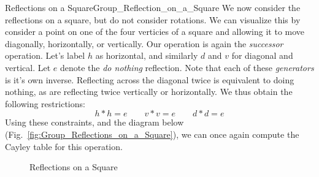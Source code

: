     \begin{lexample}{Reflections on a Square}{Group_Reflection_on_a_Square}
        We now consider the reflections on a square, but do not consider
        rotations. We can visualize this by consider a point on one of the
        four verticies of a square and allowing it to move diagonally,
        horizontally, or vertically. Our operation is again the
        \textit{successor} operation. Let's label $h$ as horizontal, and
        similarly $d$ and $v$ for diagonal and vertical. Let $e$ denote the
        \textit{do nothing} reflection. Note that each of these
        \textit{generators} is it's own inverse. Reflecting across the
        diagonal twice is equivalent to doing nothing, as are reflecting twice
        vertically or horizontally. We thus obtain the following restrictions:
        \begin{equation}
            h*h=e
            \quad\quad
            v*v=e
            \quad\quad
            d*d=e
        \end{equation}
        Using these constraints, and the diagram below
        (Fig.~\ref{fig:Group_Reflections_on_a_Square}), we can once again
        compute the Cayley table for this operation.
        \begin{figure}[H]
            \centering
            \captionsetup{type=figure}
            \caption{Reflections on a Square}

\end{figure}
\end{lexample}
